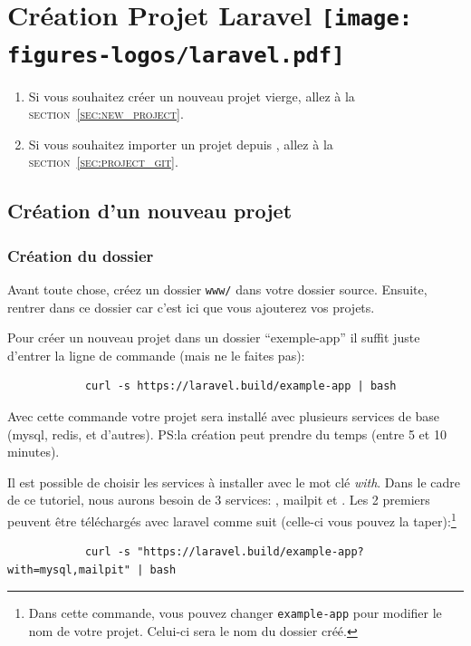 \section[Création Projet Laravel]{Création Projet Laravel \texttt{[image: figures-logos/laravel.pdf]}}

\begin{enumerate}
    \item Si vous souhaitez créer un nouveau projet vierge, allez à la \textsc{section~\ref{sec:new_project}}.
    \item Si vous souhaitez importer un projet depuis \github{}, allez à la \textsc{section~\ref{sec:project_git}}.
\end{enumerate}

\subsection[Création d'un nouveau projet]{Création d'un nouveau projet\label{sec:new_project}}
    \subsubsection[Création du dossier]{Création du dossier}
        Avant toute chose, créez un dossier \verb|www/| dans votre dossier source. Ensuite, rentrer dans ce dossier car c'est ici que vous ajouterez vos projets.
        
        Pour créer un nouveau projet \laravel{} dans un dossier ``exemple-app'' il suffit juste d'entrer la ligne de commande (mais ne le faites pas):

        \begin{lstlisting}
            curl -s https://laravel.build/example-app | bash
        \end{lstlisting}

        Avec cette commande votre projet sera installé avec plusieurs services de base (mysql, redis, et d'autres). PS:la création peut prendre du temps (entre 5 et 10 minutes).

        Il est possible de choisir les services à installer avec le mot clé \textit{with}. Dans le cadre de ce tutoriel, nous aurons besoin de 3 services: \mysql, mailpit et \phpmyadmin. Les 2 premiers peuvent être téléchargés avec laravel comme suit (celle-ci vous pouvez la taper):\footnote{Dans cette commande, vous pouvez changer \verb|example-app| pour modifier le nom de votre projet. Celui-ci sera le nom du dossier créé.}

        \begin{lstlisting}
            curl -s "https://laravel.build/example-app?with=mysql,mailpit" | bash
        \end{lstlisting}


